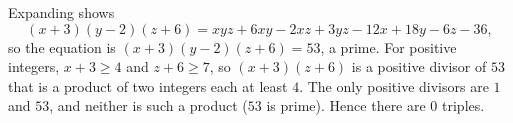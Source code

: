 Expanding shows
\[(x+3)(y-2)(z+6)=xyz+6xy-2xz+3yz-12x+18y-6z-36,\]
so the equation is $(x+3)(y-2)(z+6)=53$, a prime. For positive integers, $x+3\ge4$ and $z+6\ge7$, so $(x+3)(z+6)$ is a positive divisor of $53$ that is a product of two integers each at least $4$. The only positive divisors are $1$ and $53$, and neither is such a product ($53$ is prime). Hence there are $\boxed{0}$ triples.
